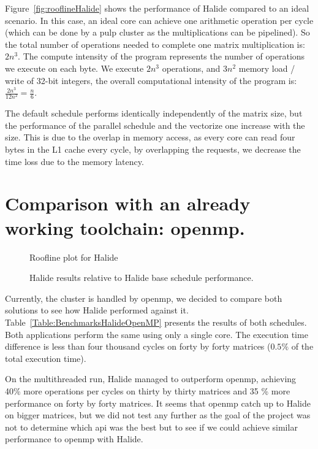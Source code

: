     Figure~\ref{fig:rooflineHalide} shows the performance of Halide compared to an ideal scenario. In this case, an ideal core can achieve one arithmetic operation per cycle (which can be done by a \gls{pulp} cluster as the multiplications can be pipelined).
So the total number of operations needed to complete one matrix multiplication is: $2n^3$.
    The compute intensity of the program represents the number of operations we execute on each byte. We execute $2n^3$ operations, and  $3n^2$ memory load / write of 32-bit integers, the overall computational intensity of the program is: $\frac{2n^3}{12n^2}=\frac{n}{6}$.

    The default schedule performs identically independently of the matrix size, but the performance of the parallel schedule and the vectorize one increase with the size.
    This is due to the overlap in memory access, as every core can read four bytes in the  L1 cache every cycle, by overlapping the requests, we decrease the time loss due to the memory latency.


    
\section{Comparison with an already working toolchain: \acrshort{openmp}.}

\begin{figure}[H]
        \center
    \scalebox{.6}{}
    \caption{Roofline plot for Halide}
    \label{fig:rooflineHalideOpenMP}
\end{figure}
\begin{figure}[H]
        \center
        \scalebox{.6}{}
    \caption{Halide results relative to Halide base schedule performance.}
    \label{fig:barPlotHalideOpenMP}
\end{figure}


    
    Currently, the cluster is handled by \gls{openmp}, we decided to compare both solutions to see how Halide performed against it.
    Table~\ref{Table:BenchmarksHalideOpenMP} presents the results of both schedules.
    Both applications perform the same using only a  single core.
    The execution time difference is less than four thousand cycles on forty by forty matrices ($0.5 \%$ of the total execution time).

    On the multithreaded run, Halide managed to outperform \gls{openmp}, achieving 40\% more operations per cycles on thirty by thirty matrices and 35 \% more performance on forty by forty matrices.
    It seems that \gls{openmp} catch up to Halide on bigger matrices, but we did not test any further as the goal of the project was not to determine which \gls{api} was the best but to see if we could achieve similar performance to  \gls{openmp} with Halide.


